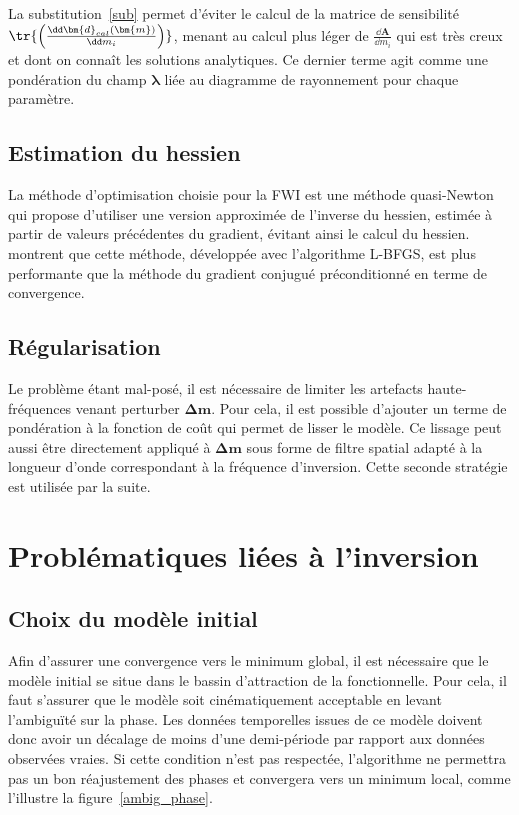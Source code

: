 La substitution~\ref{sub} permet d'éviter le calcul de la matrice de sensibilité $\tr{\left( \frac{\dd \bm{d}_{cal}(\bm{m}) }{\dd m_{i}} \right)}$, menant au calcul plus léger de $\frac{\dd \bm{A}}{\dd m_{i}}$ qui est très creux et dont on connaît les solutions analytiques. Ce dernier terme agit comme une pondération du champ $\bm{\lambda}$ liée au diagramme de rayonnement pour chaque paramètre.


\subsection{Estimation du hessien}

La méthode d'optimisation choisie pour la FWI est une méthode quasi-Newton qui propose d'utiliser une version approximée de l'inverse du hessien, estimée à partir de valeurs précédentes du gradient, évitant ainsi le calcul du hessien. \cite{brossier_2009} montrent que cette méthode, développée avec l'algorithme L-BFGS, est plus performante que la méthode du gradient conjugué préconditionné en terme de convergence. 


\subsection{Régularisation}

Le problème étant mal-posé, il est nécessaire de limiter les artefacts haute-fréquences venant perturber $\bm{\Delta m}$. Pour cela, il est possible d'ajouter un terme de pondération à la fonction de coût qui permet de lisser le modèle. Ce lissage peut aussi être directement appliqué à $\bm{\Delta m}$ sous forme de filtre spatial adapté à la longueur d'onde correspondant à la fréquence d'inversion. Cette seconde stratégie est utilisée par la suite.

\section{Problématiques liées à l'inversion}

\subsection{Choix du modèle initial \label{fwi:choix_modele}}
Afin d'assurer une convergence vers le minimum global, il est nécessaire que le modèle initial se situe dans le bassin d'attraction de la fonctionnelle. Pour cela, il faut s'assurer que le modèle soit cinématiquement acceptable en levant l’ambiguïté sur la phase. Les données temporelles issues de ce modèle doivent donc avoir un décalage de moins d'une demi-période par rapport aux données observées vraies. Si cette condition n'est pas respectée, l'algorithme ne permettra pas un bon réajustement des phases et convergera vers un minimum local, comme l'illustre la figure~\ref{ambig_phase}.

